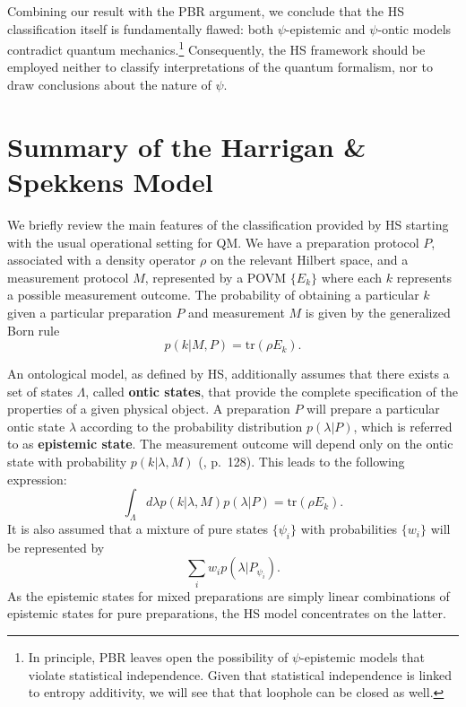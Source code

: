 \documentclass[10pt,twocolumn, nofootinbib]{revtex4-2}
\begin{document}
Combining our result with the PBR argument, we conclude that the HS classification itself is fundamentally flawed: both $\psi$-epistemic and $\psi$-ontic models contradict quantum mechanics.\footnote{In principle, PBR leaves open the possibility of $\psi$-epistemic models that violate statistical independence. Given that statistical independence is linked to entropy additivity, we will see that that loophole can be closed as well.} Consequently, the HS framework should be employed neither to classify interpretations of the quantum formalism, nor to draw conclusions about the nature of $\psi$. 

\section{Summary of the Harrigan \& Spekkens Model}

We briefly review the main features of the classification provided by HS starting with the usual operational setting for QM. We have a preparation protocol $P$, associated with a density operator $\rho$ on the relevant Hilbert space, and a measurement protocol $M$, represented by a POVM $\{ E_k\}$ where each $k$ represents a possible measurement outcome. The probability of obtaining a particular $k$ given a particular preparation $P$ and measurement $M$ is given by the generalized Born rule
\begin{equation}
	p(k|M, P)=\textrm{tr}(\rho E_k).
\end{equation}

An ontological model, as defined by HS, additionally assumes that there exists a set of states $\Lambda$, called \textbf{ontic states}, that provide the complete specification of the properties of a given physical object. A preparation $P$ will prepare a particular ontic state $\lambda$ according to the probability distribution $p(\lambda | P)$, which is referred to as \textbf{epistemic state}. The measurement outcome will depend only on the ontic state with probability $p(k|\lambda, M)$ (\cite{Harrigan:2010}, p.\ 128). This leads to the following expression:
\begin{equation}\label{prob_condition}
	\int_\Lambda d\lambda p(k|\lambda, M) p(\lambda| P)= \textrm{tr}(\rho E_k).
\end{equation}
It is also assumed that a mixture of pure states $\{ \psi_i \}$ with probabilities $\{ w_i \}$ will be represented by
\begin{equation}\label{epistemic_mixing}
	\sum_i  w_i p(\lambda| P_{\psi_i}).
\end{equation}
As the epistemic states for mixed preparations are simply linear combinations of epistemic states for pure preparations, the HS model concentrates on the latter.
\end{document}
